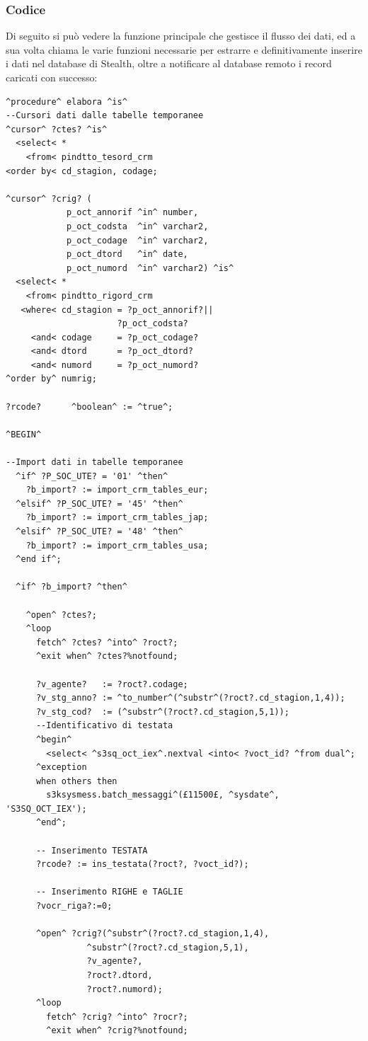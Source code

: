 \subsubsection{Codice}
Di seguito si può vedere la funzione principale che gestisce il flusso dei dati, ed a sua volta chiama le varie funzioni necessarie per estrarre e definitivamente inserire i dati nel database di Stealth, oltre a notificare al database remoto i record caricati con successo:
\begin{lstlisting}[frame=single, style=base]
^procedure^ elabora ^is^
--Cursori dati dalle tabelle temporanee
^cursor^ ?ctes? ^is^
  <select< *
    <from< pindtto_tesord_crm
<order by< cd_stagion, codage;

^cursor^ ?crig? (
            p_oct_annorif ^in^ number,
            p_oct_codsta  ^in^ varchar2,
            p_oct_codage  ^in^ varchar2,
            p_oct_dtord   ^in^ date,
            p_oct_numord  ^in^ varchar2) ^is^
  <select< *
    <from< pindtto_rigord_crm
   <where< cd_stagion = ?p_oct_annorif?||
                      ?p_oct_codsta?
     <and< codage     = ?p_oct_codage?
     <and< dtord      = ?p_oct_dtord?
     <and< numord     = ?p_oct_numord?
^order by^ numrig;

?rcode?      ^boolean^ := ^true^;

^BEGIN^
  
--Import dati in tabelle temporanee
  ^if^ ?P_SOC_UTE? = '01' ^then^
    ?b_import? := import_crm_tables_eur;
  ^elsif^ ?P_SOC_UTE? = '45' ^then^
    ?b_import? := import_crm_tables_jap;
  ^elsif^ ?P_SOC_UTE? = '48' ^then^
    ?b_import? := import_crm_tables_usa;
  ^end if^;

  ^if^ ?b_import? ^then^ 

    ^open^ ?ctes?;
    ^loop
      fetch^ ?ctes? ^into^ ?roct?;
      ^exit when^ ?ctes?%notfound;

      ?v_agente?   := ?roct?.codage;
      ?v_stg_anno? := ^to_number^(^substr^(?roct?.cd_stagion,1,4));
      ?v_stg_cod?  := (^substr^(?roct?.cd_stagion,5,1));
      --Identificativo di testata
      ^begin^
        <select< ^s3sq_oct_iex^.nextval <into< ?voct_id? ^from dual^;
      ^exception
      when others then
        s3ksysmess.batch_messaggi^(£11500£, ^sysdate^, 'S3SQ_OCT_IEX');
      ^end^;

      -- Inserimento TESTATA
      ?rcode? := ins_testata(?roct?, ?voct_id?);

      -- Inserimento RIGHE e TAGLIE
      ?vocr_riga?:=0;

      ^open^ ?crig?(^substr^(?roct?.cd_stagion,1,4),
                ^substr^(?roct?.cd_stagion,5,1),
                ?v_agente?,
                ?roct?.dtord,
                ?roct?.numord);
      ^loop
        fetch^ ?crig? ^into^ ?rocr?;
        ^exit when^ ?crig?%notfound;
          

\end{lstlisting}
